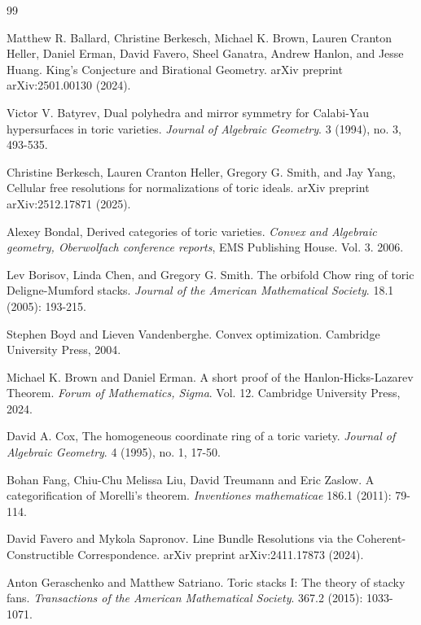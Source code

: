 \documentclass[11pt,reqno]{amsart}
\theoremstyle{definition}
\numberwithin{equation}{section}
\begin{document}
\smallskip

\begin{thebibliography}{99}

     Matthew R. Ballard, Christine Berkesch, Michael K. Brown, Lauren Cranton Heller, Daniel Erman, David Favero, Sheel Ganatra, Andrew Hanlon, and Jesse Huang. King's Conjecture and Birational Geometry. arXiv preprint arXiv:2501.00130 (2024).

     Victor V. Batyrev, 
Dual polyhedra and mirror symmetry for Calabi-Yau hypersurfaces in toric varieties. \textit{Journal of Algebraic Geometry}. 3 (1994), no. 3, 493-535.


     Christine Berkesch, Lauren Cranton Heller, Gregory G. Smith, and Jay Yang, Cellular free resolutions for normalizations of toric ideals. arXiv preprint arXiv:2512.17871 (2025).

     Alexey Bondal, Derived categories of toric varieties. \textit{Convex and Algebraic geometry, Oberwolfach conference reports}, EMS Publishing House. Vol. 3. 2006.


     Lev Borisov, Linda Chen, and Gregory G. Smith. The orbifold Chow ring of toric Deligne-Mumford stacks. \textit{Journal of the American Mathematical Society}. 18.1 (2005): 193-215.

     Stephen Boyd and Lieven Vandenberghe. Convex optimization. Cambridge University Press, 2004.

     Michael K. Brown and Daniel Erman. A short proof of the Hanlon-Hicks-Lazarev Theorem. \textit{Forum of Mathematics, Sigma}. Vol. 12. Cambridge University Press, 2024.

     David A. Cox,  The homogeneous coordinate ring of a toric variety. \textit{Journal of Algebraic Geometry}. 4 (1995), no. 1, 17-50.

     Bohan Fang, Chiu-Chu Melissa Liu, David Treumann and Eric Zaslow. A categorification of Morelli's theorem. \textit{Inventiones mathematicae} 186.1 (2011): 79-114.

     David Favero and Mykola Sapronov. Line Bundle Resolutions via the Coherent-Constructible Correspondence. arXiv preprint arXiv:2411.17873 (2024).


     Anton Geraschenko and Matthew Satriano. Toric stacks I: The theory of stacky fans. \textit{Transactions of the American Mathematical Society}. 367.2 (2015): 1033-1071.



\end{thebibliography}
\end{document}
